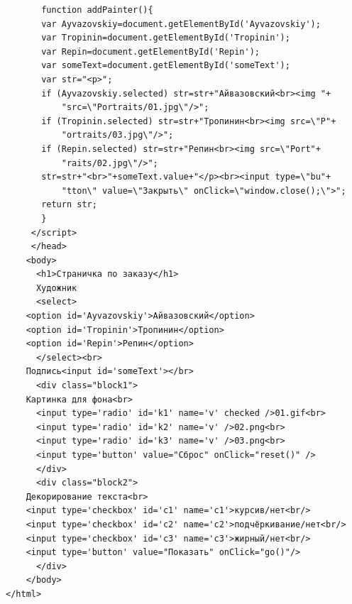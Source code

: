 \begin{verbatim}
       function addPainter(){
	   var Ayvazovskiy=document.getElementById('Ayvazovskiy');
	   var Tropinin=document.getElementById('Tropinin');
	   var Repin=document.getElementById('Repin');
	   var someText=document.getElementById('someText');
	   var str="<p>";
	   if (Ayvazovskiy.selected) str=str+"Айвазовский<br><img "+
	       "src=\"Portraits/01.jpg\"/>";
	   if (Tropinin.selected) str=str+"Тропинин<br><img src=\"P"+
	       "ortraits/03.jpg\"/>";
	   if (Repin.selected) str=str+"Репин<br><img src=\"Port"+
	       "raits/02.jpg\"/>";
	   str=str+"<br>"+someText.value+"</p><br><input type=\"bu"+
	       "tton\" value=\"Закрыть\" onClick=\"window.close();\">";
	   return str;
       }
     </script>
     </head>
    <body>
      <h1>Страничка по заказу</h1>
      Художник
      <select>
	<option id='Ayvazovskiy'>Айвазовский</option>
	<option id='Tropinin'>Тропинин</option>
	<option id='Repin'>Репин</option>
      </select><br>
	Подпись<input id='someText'></br>
      <div class="block1">
	Картинка для фона<br>
      <input type='radio' id='k1' name='v' checked />01.gif<br>
      <input type='radio' id='k2' name='v' />02.png<br>
      <input type='radio' id='k3' name='v' />03.png<br>
      <input type='button' value="Сброс" onClick="reset()" />
      </div>
      <div class="block2">
	Декорирование текста<br>
	<input type='checkbox' id='c1' name='c1'>курсив/нет<br/>
	<input type='checkbox' id='c2' name='c2'>подчёркивание/нет<br/>
	<input type='checkbox' id='c3' name='c3'>жирный/нет<br/>
	<input type='button' value="Показать" onClick="go()"/>
      </div>
    </body>
</html>
\end{verbatim}
